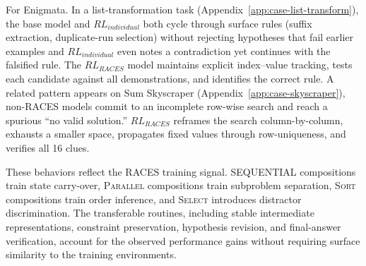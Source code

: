 For Enigmata. In a list-transformation task (Appendix~\ref{app:case-list-transform}), the base model and $RL_{individual}$ both cycle through surface rules (suffix extraction, duplicate-run selection) without rejecting hypotheses that fail earlier examples and $RL_{individual}$ even notes a contradiction yet continues with the falsified rule. The $RL_{RACES}$ model maintains explicit index–value tracking, tests each candidate against all demonstrations, and identifies the correct rule. A related pattern appears on Sum Skyscraper (Appendix~\ref{app:case-skyscraper}), non-RACES models commit to an incomplete row-wise search and reach a spurious “no valid solution.” $RL_{RACES}$ reframes the search column-by-column, exhausts a smaller space, propagates fixed values through row-uniqueness, and verifies all 16 clues.

These behaviors reflect the RACES training signal. \textsc{SEQUENTIAL} compositions train state carry-over, \textsc{Parallel} compositions train subproblem separation, \textsc{Sort} compositions train order inference, and \textsc{Select} introduces distractor discrimination. The transferable routines, including stable intermediate representations, constraint preservation, hypothesis revision, and final-answer verification, account for the observed performance gains without requiring surface similarity to the training environments.